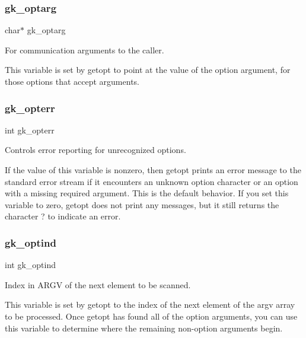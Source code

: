 \subsubsection{\texorpdfstring{gk\+\_\+optarg}{gk\_optarg}}
{\footnotesize\ttfamily char$\ast$ gk\+\_\+optarg}



For communication arguments to the caller. 

This variable is set by getopt to point at the value of the option argument, for those options that accept arguments. \mbox{\label{a00050_abf798c082a4ebebbd9482c931c109541}} 
\subsubsection{\texorpdfstring{gk\+\_\+opterr}{gk\_opterr}}
{\footnotesize\ttfamily int gk\+\_\+opterr}



Controls error reporting for unrecognized options. 

If the value of this variable is nonzero, then getopt prints an error message to the standard error stream if it encounters an unknown option character or an option with a missing required argument. This is the default behavior. If you set this variable to zero, getopt does not print any messages, but it still returns the character ? to indicate an error. \mbox{\label{a00050_ab70fc0e7e22192b687bd0d377bf61e32}} 
\subsubsection{\texorpdfstring{gk\+\_\+optind}{gk\_optind}}
{\footnotesize\ttfamily int gk\+\_\+optind}



Index in A\+R\+GV of the next element to be scanned. 

This variable is set by getopt to the index of the next element of the argv array to be processed. Once getopt has found all of the option arguments, you can use this variable to determine where the remaining non-\/option arguments begin. \mbox{\label{a00050_ac77d8583b792a19e5afae69bb702a23a}} 
